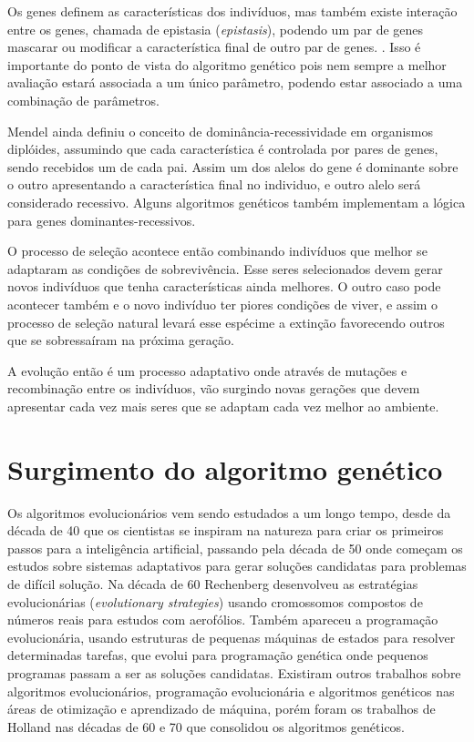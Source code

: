 Os genes definem as características dos indivíduos, mas também existe interação entre os genes, chamada de epistasia (\textit{epistasis}), podendo um par de genes mascarar ou modificar a característica final de outro par de genes. \cite{Klug2011}. Isso é importante do ponto de vista do algoritmo genético pois nem sempre a melhor avaliação estará associada a um único parâmetro, podendo estar associado a uma combinação de parâmetros.

Mendel ainda definiu o conceito de dominância-recessividade em organismos diplóides, assumindo que cada característica é controlada por pares de genes, sendo recebidos um de cada pai. Assim um dos alelos do gene é dominante sobre o outro apresentando a característica final no individuo, e outro alelo será considerado recessivo. Alguns algoritmos genéticos também implementam a lógica para genes dominantes-recessivos.

O processo de seleção acontece então combinando indivíduos que melhor se adaptaram as condições de sobrevivência. Esse seres selecionados devem gerar novos indivíduos que tenha características ainda melhores. O outro caso pode acontecer também e o novo indivíduo ter piores condições de viver, e assim o processo de seleção natural levará esse espécime a extinção favorecendo outros que se sobressaíram na próxima geração.

A evolução então é um processo adaptativo onde através de mutações e recombinação entre os indivíduos, vão surgindo novas gerações que devem apresentar cada vez mais seres que se adaptam cada vez melhor ao ambiente.

\section{Surgimento do algoritmo genético}

Os algoritmos evolucionários vem sendo estudados a um longo tempo, desde da década de 40 que os cientistas se inspiram na natureza para criar os primeiros passos para a inteligência artificial, passando pela década de 50 onde começam os estudos sobre sistemas adaptativos para gerar soluções candidatas para problemas de difícil solução. Na década de 60 Rechenberg desenvolveu as estratégias evolucionárias (\textit{evolutionary strategies}) usando cromossomos compostos de números reais para estudos com aerofólios. Também apareceu a programação evolucionária, usando estruturas de pequenas máquinas de estados para resolver determinadas tarefas, que evolui para programação genética onde pequenos programas passam a ser as soluções candidatas. Existiram outros trabalhos sobre algoritmos evolucionários, programação evolucionária e algoritmos genéticos nas áreas de otimização e aprendizado de máquina, porém foram os trabalhos de Holland nas décadas de 60 e 70 que consolidou os algoritmos genéticos. \cite{Mitchell1996, Linden2008}

